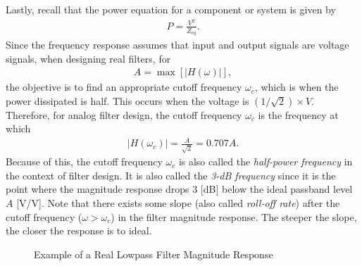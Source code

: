\documentclass{report}
\begin{document}
\noindent Lastly, recall that the power equation for a component or system is given by 
\begin{align}
    P = \frac{V^2}{Z_{eq}}.
\end{align}
Since the frequency response assumes that input and output signals are voltage signals, when designing real filters, for 
\begin{align}
    A = \max[|H(\omega)|],
\end{align}
the objective is to find an appropriate cutoff frequency $\omega_c$, which is when the power dissipated is half. This occurs 
when the voltage is $(1/\sqrt{2})\times V$. Therefore, for analog filter design, the cutoff frequency $\omega_c$ is the frequency at which 
\begin{align}
    |H(\omega_c)| = \frac{A}{\sqrt{2}} = 0.707A.
\end{align}
Because of this, the cutoff frequency $\omega_c$ is also called the \emph{half-power frequency} in the context of filter design. It is also called the \emph{3-dB frequency} 
since it is the point where the magnitude response drops 3 [dB] below the ideal passband level $A$ [V/V]. Note that there exists some slope (also called \emph{roll-off rate}) after the 
cutoff frequency ($\omega>\omega_c$) in the filter magnitude response. The steeper the slope, the closer the response is to ideal.
\begin{figure}[!hbt]
    \centering
    \caption{Example of a Real Lowpass Filter Magnitude Response}
    \label{lpf_ex}
\end{figure}
\end{document}
